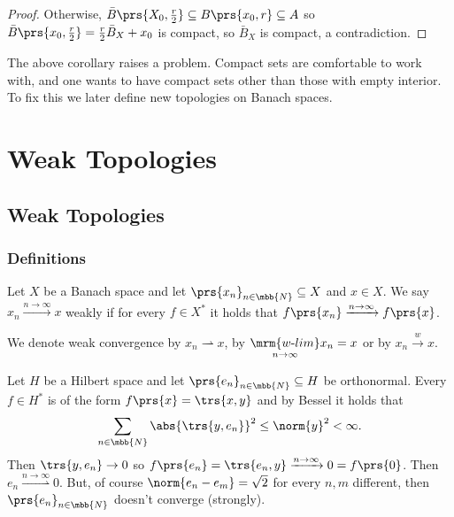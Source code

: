 \documentclass[10pt, twoside]{book}
\begin{document}
\begin{proof}
Otherwise, $\bar{B}\prs{X_0, \frac{r}{2}} \subseteq B\prs{x_0, r} \subseteq A$ so $\bar{B}\prs{x_0, \frac{r}{2}} = \frac{r}{2} \bar{B}_X + x_0$ is compact, so $\bar{B}_X$ is compact, a contradiction.
\end{proof}

The above corollary raises a problem. Compact sets are comfortable to work with, and one wants to have compact sets other than those with empty interior. To fix this we later define new topologies on Banach spaces.


\chapter{Weak Topologies}

\section{Weak Topologies}

\subsection{Definitions}

\begin{definition}
Let $X$ be a Banach space and let $\prs{x_n}_{n \in \mbb{N}} \subseteq X$ and $x \in X$. We say $x_n \xrightarrow{n\to\infty} x$ weakly if for every $f \in X^*$ it holds that $f\prs{x_n} \xrightarrow{n\to\infty} f\prs{x}$.
\end{definition}

\begin{notation}
We denote weak convergence by $x_n \rightharpoonup x$, by $\underset{n\to\infty}{\mrm{w\text{-}lim}} x_n = x$ or by $x_n \xrightarrow{w} x$.
\end{notation}

\begin{example}
Let $H$ be a Hilbert space and let $\prs{e_n}_{n \in \mbb{N}} \subseteq H$ be orthonormal. Every $f \in H^*$ is of the form $f\prs{x} = \trs{x,y}$ and by Bessel it holds that
\[\sum_{n \in \mbb{N}} \abs{\trs{y,e_n}}^2 \leq \norm{y}^2 < \infty \text{.}\]
Then $\trs{y, e_n} \to 0$ so $f\prs{e_n} = \trs{e_n, y} \xrightarrow{n\to\infty} 0 = f\prs{0}$.
Then $e_n \overset{n\to\infty}{\rightharpoonup} 0$. But, of course $\norm{e_n - e_m} = \sqrt{2}$ for every $n,m$ different, then $\prs{e_n}_{n \in \mbb{N}}$ doesn't converge (strongly).
\end{example}
\end{document}
